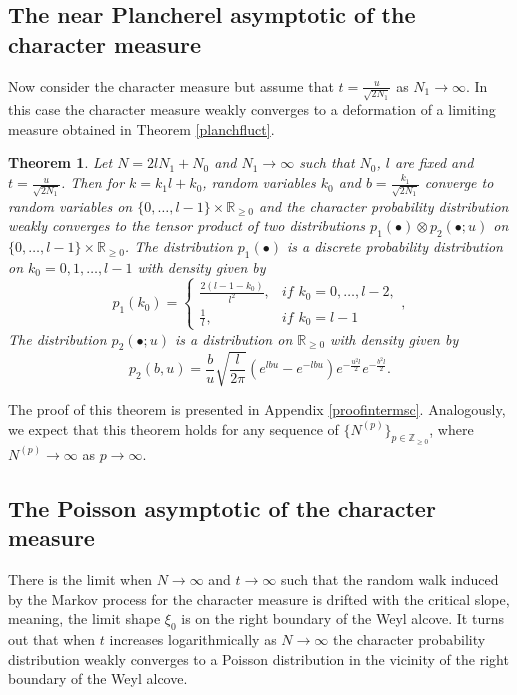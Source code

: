 \documentclass[11pt]{amsart}
\newtheorem{theorem}{Theorem}[section]
\begin{document}
\subsection{The near Plancherel asymptotic of the character measure}
Now consider the character measure but assume that $t=\frac{u}{\sqrt{2N_1}}$ as $N_1\to\infty$. In this case the character measure weakly converges to a deformation of a limiting measure obtained in Theorem \ref{planchfluct}.
\begin{theorem}\label{intermsc}
    Let $N=2lN_1+N_0$ and $N_1\to\infty$ such that $N_0$, $l$ are fixed and $t=\frac{u}{\sqrt{2N_1}}$. Then for $k=k_1l+k_0$, random variables $k_0$ and $b=\frac{k_1}{\sqrt{2N_1}}$ converge to random variables on $\{0,\ldots,l-1\}\times \mathbb{R}_{\geq 0}$ and the character probability distribution weakly converges to the tensor product of two distributions $p_1(\bullet)\otimes p_2(\bullet;u)$ on $\{0,\ldots,l-1\}\times \mathbb{R}_{\geq 0}$. The distribution $p_1(\bullet)$ is a discrete probability distribution on $k_0=0,1,\ldots,l-1$ with density given by
	\begin{equation*}
	p_1(k_0)=\begin{cases}
	\frac{2(l-1-k_0)}{l^2},& \textit{if $k_0=0,\ldots,l-2$},\\
	\frac{1}{l},& \textit{if $k_0=l-1$}
	\end{cases},
	\end{equation*}
	The distribution $p_2(\bullet;u)$ is a distribution on $\mathbb{R}_{\geq 0}$ with density given by
	\begin{equation*}
	p_2(b,u)=\frac{b}{u}\sqrt{\frac{l}{2\pi}}(e^{lbu}-e^{-lbu})e^{-\frac{u^2l}{2}} e^{-\frac{b^2l}{2}}.
	\end{equation*}
\end{theorem}
The proof of this theorem is presented in Appendix \ref{proofintermsc}.
Analogously, we expect that this theorem holds for any sequence of $\{N^{(p)}\}_{p\in\mathbb{Z}_{\geq 0}}$, where $N^{(p)}\to\infty$ as $p\to\infty$.



\subsection{The Poisson asymptotic of the character measure}
There is the limit when $N\to\infty$ and $t\to\infty$ such that the random walk induced by the Markov process for the character measure is drifted with the critical slope, meaning, the limit shape $\xi_0$ is on the right boundary of the Weyl alcove. It turns out that when $t$ increases logarithmically as $N\to\infty$ the character probability distribution weakly converges to a Poisson distribution in the vicinity of the right boundary of the Weyl alcove.
\end{document}
